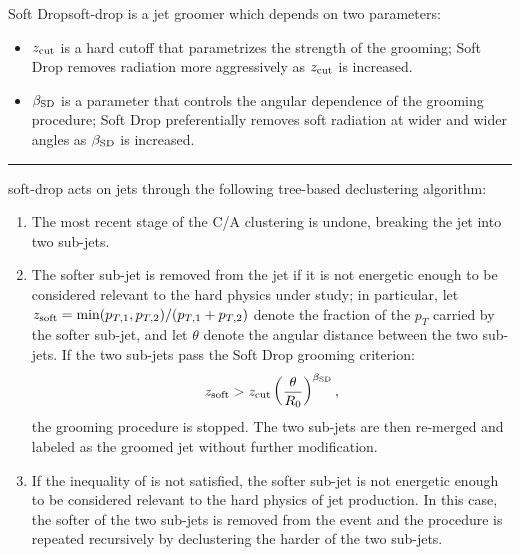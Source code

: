 \begin{definitionbox}{Soft Drop}{soft-drop}
     is a jet groomer which depends on two parameters:
    \begin{itemize}
        \item
            \(z_{\rm cut}\) is a hard cutoff that parametrizes the strength of the grooming;
            Soft Drop removes radiation more aggressively as \(z_{\rm cut}\) is increased.

        \item
            \(\mathbf{\beta_{\rm SD}}\) is a parameter that controls the angular dependence of the grooming procedure;
        Soft Drop preferentially removes soft radiation at wider and wider angles as \(\beta_{\rm SD}\) is increased.
    \end{itemize}

    \vspace{7pt}
    \hrule
    \vspace{7pt}

    \gls{soft-drop} acts on jets through the following tree-based \gls{declustering} algorithm:
    \begin{enumerate}
        \item
        \label{item:declustering}
        The most recent stage of the C/A clustering is undone, breaking the jet into two sub-jets.

        \item
        The softer sub-jet is removed from the jet if it is not energetic enough to be considered relevant to the hard physics under study;
        in particular, let \(z_{\rm soft} = \min(p_{T,1}, p_{T,2})/(p_{T,1} + p_{T,2})\) denote the fraction of the \(p_T\) carried by the softer sub-jet, and let \(\theta\) denote the angular distance between the two sub-jets.
        If the two sub-jets pass the Soft Drop grooming criterion:
         \begin{align}
            \label{eq:softdropcriterion}
            z_{\rm soft} > \zcut \left(\frac{\theta}{R_0}\right)^{\beta_{\rm SD}}
            ,
        \end{align}
        the grooming procedure is stopped.
        The two sub-jets are then re-merged and labeled as the groomed jet without further modification.

        \item
        If the inequality of  is not satisfied, the softer sub-jet is not energetic enough to be considered relevant to the hard physics of jet production.
        In this case, the softer of the two sub-jets is removed from the event and the procedure is repeated recursively by \gls{declustering} the harder of the two sub-jets.
    \end{enumerate}
\end{definitionbox}

